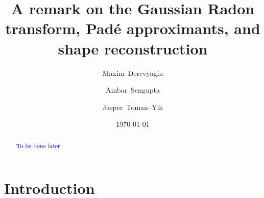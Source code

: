 \documentclass{amsart}
\theoremstyle{remark}
\numberwithin{equation}{section}
\newcommand{\tc}{\textcolor{blue}}
\begin{document}
\title{A remark on the Gaussian Radon transform, Pad\'e approximants, and shape reconstruction}


\date{\today}

\author[M.~Derevyagin]{Maxim~Derevyagin}
\address{
MD,
Department of Mathematics\\
University of Connecticut\\
341 Mansfield Road, U-1009\\
Storrs, CT 06269–1009, USA}

\author[A.~Sengupta]{Ambar~Sengupta}
\address{
AS,
Department of Mathematics\\
University of Connecticut\\
341 Mansfield Road, U–1009\\
Storrs, CT 0626–91009, USA}

\author[J.~Toman–Yih]{Jasper~Toman–Yih}
\address{
JT,
Department of Mathematics\\
University of Connecticut\\
341 Mansfield Road, U–1009\\
Storrs, CT 06269–1009, USA}


\begin{abstract}
\tc{To be done later}
\end{abstract}

\maketitle

\section{Introduction}

\end{document}
